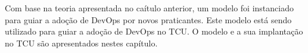 Com base na teoria apresentada no caítulo anterior, um modelo foi instanciado
para guiar a adoção de DevOps por novos praticantes. Este modelo está sendo
utilizado para guiar a adoção de DevOps no \acrshort{TCU}. O modelo e a sua
implantação no \acrshort{TCU} são apresentados nestes capítulo. 
